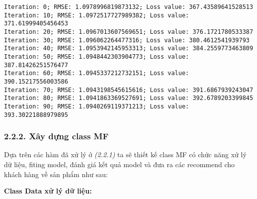 \documentclass[11pt]{article}
\begin{document}
    \begin{Verbatim}[commandchars=\\\{\}]
Iteration: 0; RMSE: 1.0978996819873132; Loss value: 367.43589641528513
Iteration: 10; RMSE: 1.0972517727989382; Loss value: 371.61999405456453
Iteration: 20; RMSE: 1.0967013607569651; Loss value: 376.1721780533387
Iteration: 30; RMSE: 1.096062264477316; Loss value: 380.4612541939793
Iteration: 40; RMSE: 1.0953942145953313; Loss value: 384.2559773463809
Iteration: 50; RMSE: 1.0948442303904773; Loss value: 387.81426251576477
Iteration: 60; RMSE: 1.0945337212732151; Loss value: 390.15217556003586
Iteration: 70; RMSE: 1.0943198545615616; Loss value: 391.6867939243047
Iteration: 80; RMSE: 1.0941863369527691; Loss value: 392.6789203399845
Iteration: 90; RMSE: 1.0940269119371213; Loss value: 393.30221888979895

    \end{Verbatim}

    \subsubsection{2.2.2. Xây dựng class
MF}\label{xuxe2y-dux1ef1ng-class-mf}

Dựa trên các hàm đã xử lý ở \emph{(2.2.1)} ta sẽ thiết kế class MF có
chức năng xử lý dữ liệu, fiting model, đánh giá kết quả model và đưa ra
các recommend cho khách hàng về sản phẩm như sau:

\textbf{Class Data xử lý dữ liệu:}
\end{document}
